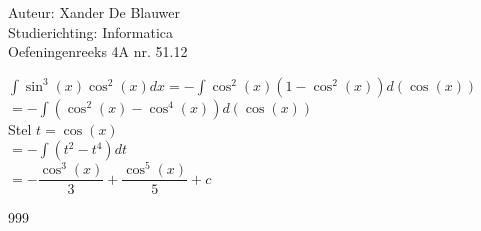 \documentclass[a4paper]{article}
\begin{document}
\noindent \large Auteur: Xander De Blauwer \\
\noindent \large Studierichting: Informatica\\
\noindent \large Oefeningenreeks 4A nr. 51.12\\

\medskip

\normalsize

$\displaystyle\int \sin^3(x) \cos^2(x)dx = - \displaystyle\int \cos^2(x)(1-\cos^2(x))d(\cos(x)) $ \\

$ = -\displaystyle\int (\cos^2(x) - \cos^4(x))d(\cos(x)) $ \\

Stel $t = \cos(x)$ \\

$ = -\displaystyle\int (t^2 - t^4)dt$ \\

$ = -\dfrac{\cos^3(x)}{3} + \dfrac{\cos^5(x)}{5} + c $ \\



\begin{thebibliography}{999}
\end{thebibliography}
\end{document}
